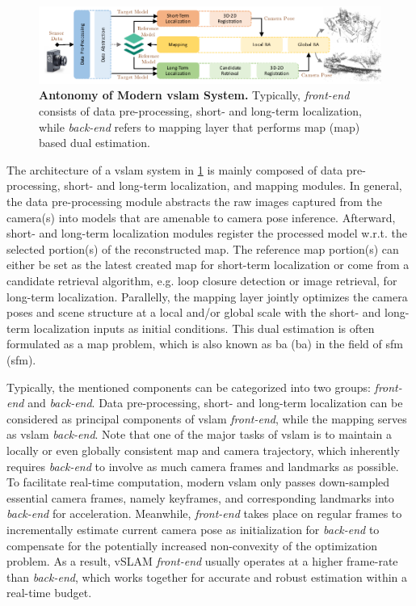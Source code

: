 \begin{figure}[t]
    \centering
	\includegraphics[width=1.0\textwidth]{figures/intro/slam.pdf}
	\caption[Antonomy of Modern \acrshort{vslam} System]{\textbf{Antonomy of Modern \acrshort{vslam} System.} Typically, {\em front-end} consists of data pre-processing, short- and long-term localization, while {\em back-end} refers to mapping layer that performs \acrlong{map} (\acrshort{map}) based dual estimation.
	\label{fig:intro_slampipeline}}
\end{figure}

The architecture of a \acrshort{vslam} system in \ref{fig:intro_slampipeline} is mainly composed of data pre-processing, short- and long-term localization, and mapping modules. 
In general, the data pre-processing module abstracts the raw images captured from the camera(s) into models that are amenable to camera pose inference. 
Afterward, short- and long-term localization modules register the processed model w.r.t. the selected portion(s) of the reconstructed map.
The reference map portion(s) can either be set as the latest created map for short-term localization or come from a candidate retrieval algorithm, e.g. loop closure detection or image retrieval, for long-term localization. 
Parallelly, the mapping layer jointly optimizes the camera poses and scene structure at a local and/or global scale with the short- and long-term localization inputs as initial conditions. 
This dual estimation is often formulated as a \acrshort{map} problem, which is also known as \acrlong{ba} (\acrshort{ba}) in the field of \acrlong{sfm} (\acrshort{sfm}).

Typically, the mentioned components can be categorized into two groups: {\em front-end} and {\em back-end}. 
Data pre-processing, short- and long-term localization can be considered as principal components of \acrshort{vslam} {\em front-end}, while the mapping serves as \acrshort{vslam} {\em back-end}.
Note that one of the major tasks of \acrshort{vslam} is to maintain a locally or even globally consistent map and camera trajectory, which inherently requires {\em back-end} to involve as much camera frames and landmarks as possible.  
To facilitate real-time computation, modern \acrshort{vslam} only passes down-sampled essential camera frames, namely keyframes, and corresponding landmarks into {\em back-end} for acceleration.
Meanwhile, {\em front-end} takes place on regular frames to incrementally estimate current camera pose as initialization for {\em back-end} to compensate for the potentially increased non-convexity of the optimization problem.
As a result, vSLAM {\em front-end} usually operates at a higher frame-rate than {\em back-end}, which works together for accurate and robust estimation within a real-time budget. 

